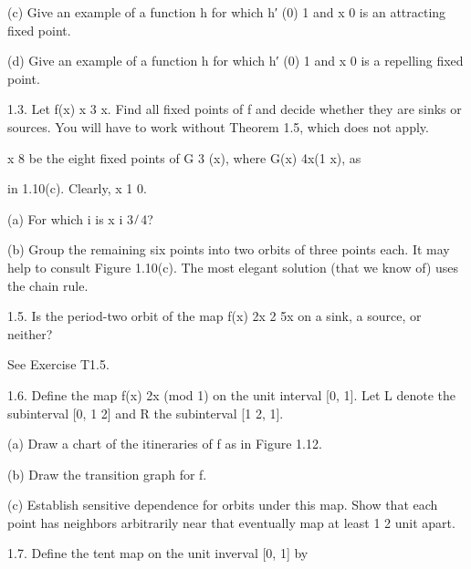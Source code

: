 \documentclass[12pt]{article}
\begin{document}
(c) Give an example of a function h for which h′ (0)  1 and x  0 is an attracting ﬁxed point.

(d) Give an example of a function h for which h′ (0)  1 and x  0 is a repelling ﬁxed point.

1.3. Let f(x)  x 3 x. Find all ﬁxed points of f and decide whether they are sinks or sources. You will 
have to work without Theorem 1.5, which does not apply.

  x 8 be the eight ﬁxed points of G 3 (x), where G(x)  4x(1  x), as

in 1.10(c). Clearly, x 1  0.

(a) For which i is x i  3 ̸ 4?

(b) Group the remaining six points into two orbits of three points each. It may help to consult Figure 
1.10(c). The most elegant solution (that we know of) uses the chain rule.

1.5. Is the period-two orbit of the map f(x)  2x 2  5x on a sink, a source, or neither?

See Exercise T1.5.

1.6. Deﬁne the map f(x)  2x (mod 1) on the unit interval [0, 1]. Let L denote the subinterval [0, 1  2] 
and R the subinterval [1  2, 1].

(a) Draw a chart of the itineraries of f as in Figure 1.12.

(b) Draw the transition graph for f.

(c) Establish sensitive dependence for orbits under this map. Show that each point has neighbors 
arbitrarily near that eventually map at least 1  2 unit apart.

1.7. Deﬁne the tent map on the unit inverval [0, 1] by
\end{document}
